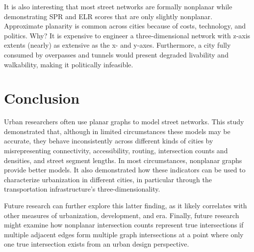 \documentclass[Afour,sageh,times]{sagej}
\begin{document}
It is also interesting that most street networks are formally nonplanar while demonstrating SPR and ELR scores that are only slightly nonplanar. Approximate planarity is common across cities because of costs, technology, and politics. Why? It is expensive to engineer a three-dimensional network with z-axis extents (nearly) as extensive as the x- and y-axes. Furthermore, a city fully consumed by overpasses and tunnels would present degraded livability and walkability, making it politically infeasible.

\section{Conclusion}

Urban researchers often use planar graphs to model street networks. This study demonstrated that, although in limited circumstances these models may be accurate, they behave inconsistently across different kinds of cities by misrepresenting connectivity, accessibility, routing, intersection counts and densities, and street segment lengths. In most circumstances, nonplanar graphs provide better models. It also demonstrated how these indicators can be used to characterize urbanization in different cities, in particular through the transportation infrastructure's three-dimensionality.

Future research can further explore this latter finding, as it likely correlates with other measures of urbanization, development, and era. Finally, future research might examine how nonplanar intersection counts represent true intersections if multiple adjacent edges form multiple graph intersections at a point where only one true intersection exists from an urban design perspective.




\end{document}
